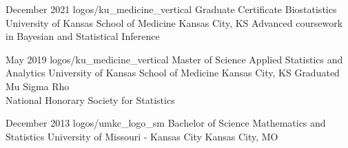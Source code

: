 
\EducationExtra
{December 2021}
{logos/ku_medicine_vertical}
{Graduate Certificate}
{Biostatistics}
{University of Kansas School of Medicine}
{Kansas City, KS}
{Advanced coursework in Bayesian and Statistical Inference}

\vspace*{0.01 in}

\EducationExtra
{May 2019}
{logos/ku_medicine_vertical}
{Master of Science}
{Applied Statistics and Analytics}
{University of Kansas School of Medicine}
{Kansas City, KS}
{Graduated Mu Sigma Rho\\ National Honorary Society for
Statistics}

\vspace*{0.01 in}

\Education
{December 2013}
{logos/umkc_logo_sm}
{Bachelor of Science}
{Mathematics and Statistics}
{University of Missouri - Kansas City}
{Kansas City, MO}